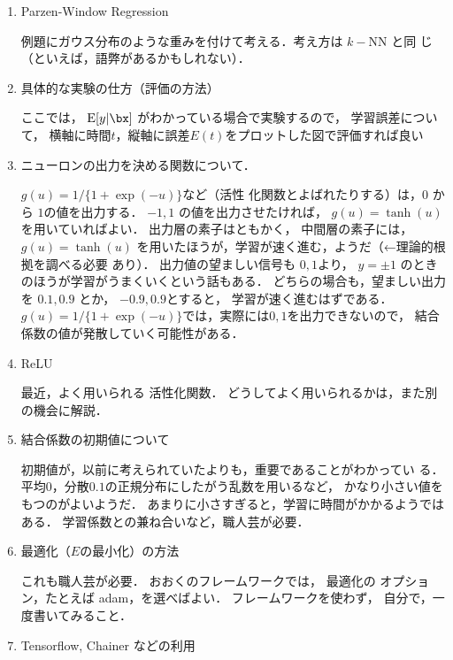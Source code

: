 \documentclass[a4paper,11pt]{jarticle}
\begin{document}
\begin{enumerate}
 \item Parzen-Window Regression

       例題にガウス分布のような重みを付けて考える．考え方は $k-$NN と同
       じ（といえば，語弊があるかもしれない）．

 \item 具体的な実験の仕方（評価の方法）

       ここでは，
       $ {\rm E }  [y | \bx]   $ がわかっている場合で実験するので，
       学習誤差について，
       横軸に時間$t$，縦軸に誤差$E(t)$をプロットした図で評価すれば良い
       
 \item ニューロンの出力を決める関数について．
       
       $g(u) = 1/\{1+\exp(-u)\}$など（活性
       化関数とよばれたりする）は，$0$ から $1$の値を出力する．
       $-1,1$ の値を出力させたければ，
       $g(u) = \tanh (u) $
       を用いていればよい．
       出力層の素子はともかく，
       中間層の素子には，
       $g(u) = \tanh (u) $
       を用いたほうが，学習が速く進む，ようだ（←理論的根拠を調べる必要
       あり）．
       出力値の望ましい信号も $0,1$より，
       $ y = \pm 1 $ のときのほうが学習がうまくいくという話もある．
       どちらの場合も，望ましい出力を $0.1,0.9$ とか，
       $-0.9, 0.9$とすると，
       学習が速く進むはずである．
       $g(u) = 1/\{1+\exp(-u)\}$では，実際には$0,1$を出力できないので，
       結合係数の値が発散していく可能性がある．

 \item ReLU

       最近，よく用いられる
       活性化関数．
       どうしてよく用いられるかは，また別の機会に解説．

 \item 結合係数の初期値について

       初期値が，以前に考えられていたよりも，重要であることがわかってい
       る．
       平均$0$，分散$0.1$の正規分布にしたがう乱数を用いるなど，
       かなり小さい値をもつのがよいようだ．
       あまりに小さすぎると，学習に時間がかかるようではある．
       学習係数との兼ね合いなど，職人芸が必要．
              
 \item  最適化（$E$の最小化）の方法

	これも職人芸が必要．
	おおくのフレームワークでは，
	最適化の
	オプション，たとえば adam，を選べばよい．
	フレームワークを使わず，
	自分で，一度書いてみること．
	
\item Tensorflow, Chainer などの利用

\end{enumerate}
\end{document}
